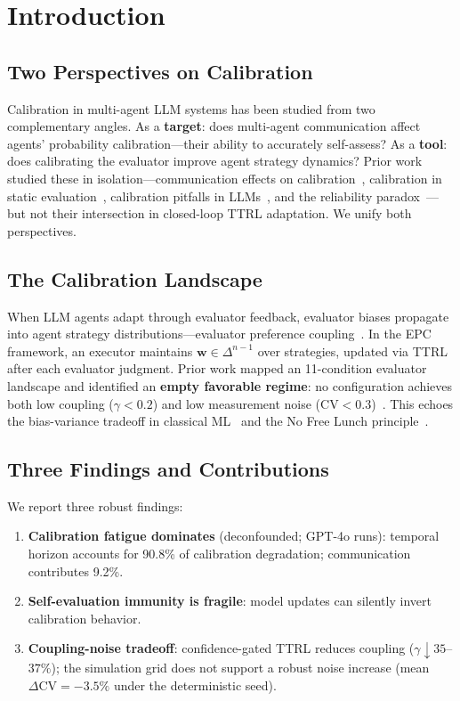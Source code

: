 \documentclass[11pt]{article}
\newcommand{\CV}{\ensuremath{\mathrm{CV}}}
\theoremstyle{definition}
\theoremstyle{remark}
\begin{document}
\section{Introduction}

\subsection{Two Perspectives on Calibration}

Calibration in multi-agent LLM systems has been studied from two complementary angles. As a \textbf{target}: does multi-agent communication affect agents' probability calibration---their ability to accurately self-assess? As a \textbf{tool}: does calibrating the evaluator improve agent strategy dynamics? Prior work studied these in isolation---communication effects on calibration~\citep{huang2026cagecal}, calibration in static evaluation~\citep{guo2017calibration}, calibration pitfalls in LLMs~\citep{tian2023calibration}, and the reliability paradox~\citep{he2026paradox}---but not their intersection in closed-loop TTRL adaptation. We unify both perspectives.

\subsection{The Calibration Landscape}

When LLM agents adapt through evaluator feedback, evaluator biases propagate into agent strategy distributions---evaluator preference coupling~\citep{epc2026}. In the EPC framework, an executor maintains $\mathbf{w} \in \Delta^{n-1}$ over strategies, updated via TTRL after each evaluator judgment. Prior work mapped an 11-condition evaluator landscape and identified an \textbf{empty favorable regime}: no configuration achieves both low coupling ($\gamma < 0.2$) and low measurement noise ($\CV < 0.3$)~\citep{caleffects2026}. This echoes the bias-variance tradeoff in classical ML~\citep{bubeck2012regret} and the No Free Lunch principle~\citep{wolpert1997no}.

\subsection{Three Findings and Contributions}

We report three robust findings:
\begin{enumerate}[leftmargin=*,nosep]
    \item \textbf{Calibration fatigue dominates} (deconfounded; GPT-4o runs): temporal horizon accounts for 90.8\% of calibration degradation; communication contributes 9.2\%.
    \item \textbf{Self-evaluation immunity is fragile}: model updates can silently invert calibration behavior.
    \item \textbf{Coupling-noise tradeoff}: confidence-gated TTRL reduces coupling ($\gamma \downarrow 35$--$37\%$); the simulation grid does not support a robust noise increase (mean $\Delta\CV = -3.5\%$ under the deterministic seed).
\end{enumerate}
\end{document}
